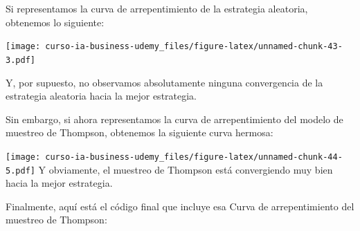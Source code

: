 \documentclass[
]{book}
\begin{document}
Si representamos la curva de arrepentimiento de la estrategia aleatoria, obtenemos lo siguiente:

\texttt{[image: curso-ia-business-udemy\_files/figure-latex/unnamed-chunk-43-3.pdf]}

Y, por supuesto, no observamos absolutamente ninguna convergencia de la estrategia aleatoria hacia la mejor estrategia.

Sin embargo, si ahora representamos la curva de arrepentimiento del modelo de muestreo de Thompson, obtenemos la siguiente curva hermosa:

\texttt{[image: curso-ia-business-udemy\_files/figure-latex/unnamed-chunk-44-5.pdf]}
Y obviamente, el muestreo de Thompson está convergiendo muy bien hacia la mejor estrategia.

Finalmente, aquí está el código final que incluye esa Curva de arrepentimiento del muestreo de Thompson:
\end{document}
